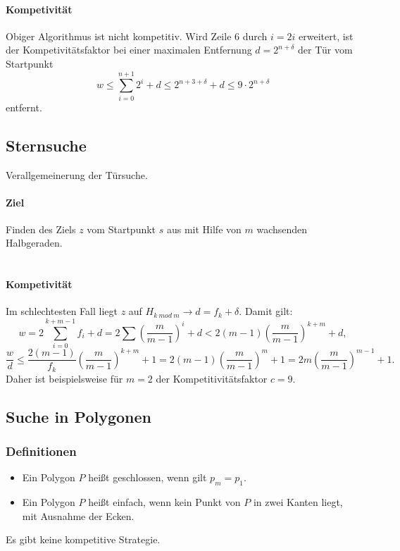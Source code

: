\paragraph{Kompetivität}
Obiger Algorithmus ist nicht kompetitiv. Wird Zeile 6 durch \(i = 2i\) erweitert, ist der Kompetivitätsfaktor bei einer maximalen Entfernung \(d=2^{n+\delta}\) der Tür vom Startpunkt
\[w \leq \sum_{i=0}^{n+1} 2^i+d \leq 2^{n+3+\delta}+d \leq 9 \cdot 2^{n+\delta}\]
entfernt.


\subsection{Sternsuche}
Verallgemeinerung der Türsuche.

\paragraph{Ziel} Finden des Ziels \(z\) vom Startpunkt \(s\) aus mit Hilfe von \(m\) wachsenden Halbgeraden.
\text{}\\\\


\paragraph{Kompetivität}
Im schlechtesten Fall liegt \(z\) auf \(H_{k~mod~m}\rightarrow d = f_k+\delta\). Damit gilt:
\[w = 2\sum_{i=0}^{k+m-1} f_i + d = 2 \sum\left(\frac{m}{m-1}\right)^i+d < 2(m-1)\left(\frac{m}{m-1}\right)^{k+m}+d,\]
\[\frac{w}{d} \leq \frac{2(m-1)}{f_k}\left(\frac{m}{m-1}\right)^{k+m}+1=2(m-1)\left(\frac{m}{m-1}\right)^m+1=2m\left(\frac{m}{m-1}\right)^{m-1}+1.\]
Daher ist beispielsweise für \(m=2\) der Kompetitivitätsfaktor \(c=9\).


\subsection{Suche in Polygonen}

\subsubsection{Definitionen}
\begin{itemize}
	\item Ein Polygon \(P\) heißt geschlossen, wenn gilt \(p_m = p_1\).
	\item Ein Polygon \(P\) heißt einfach, wenn kein Punkt von \(P\) in zwei Kanten liegt, mit Ausnahme der Ecken.
\end{itemize}
Es gibt keine kompetitive Strategie.

